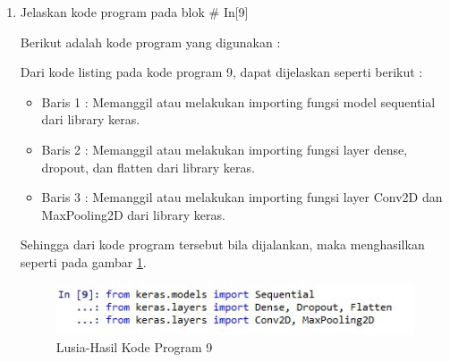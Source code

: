 \begin{enumerate}
\item Jelaskan kode program pada blok \# In[9]
	\par Berikut adalah kode program yang digunakan :
	
	\par Dari kode listing pada kode program 9, dapat dijelaskan seperti berikut :
	\begin{itemize}
	\item Baris 1	: Memanggil atau melakukan importing fungsi model sequential dari library keras.
	\item Baris 2	: Memanggil atau melakukan importing fungsi layer dense, dropout, dan flatten dari library keras.
	\item Baris 3	: Memanggil atau melakukan importing fungsi layer Conv2D dan MaxPooling2D dari library keras.
	\end{itemize}
	\par Sehingga dari kode program tersebut bila dijalankan, maka menghasilkan seperti pada gambar \ref{7B9}.
		\begin{figure}[!hbtp]
		\centering
		\includegraphics[scale=0.5]{figures/w9.jpg}
		\caption{Lusia-Hasil Kode Program 9}
		\label{7B9}
		\end{figure}


\end{enumerate}
